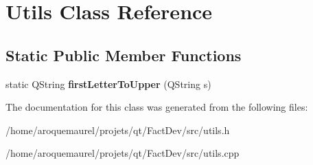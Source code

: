 \hypertarget{classUtils}{\section{Utils Class Reference}
\label{classUtils}
}
\subsection*{Static Public Member Functions}
\begin{DoxyCompactItemize}
\item 
\hypertarget{classUtils_a009b2a8ef00831aff87d2e46ca209398}{static Q\-String {\bfseries first\-Letter\-To\-Upper} (Q\-String s)}\label{classUtils_a009b2a8ef00831aff87d2e46ca209398}

\end{DoxyCompactItemize}


The documentation for this class was generated from the following files\-:\begin{DoxyCompactItemize}
\item 
/home/aroquemaurel/projets/qt/\-Fact\-Dev/src/utils.\-h\item 
/home/aroquemaurel/projets/qt/\-Fact\-Dev/src/utils.\-cpp\end{DoxyCompactItemize}
